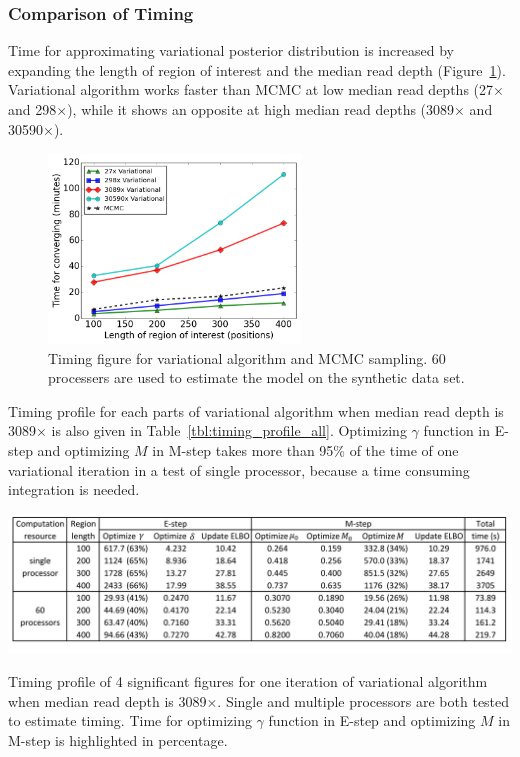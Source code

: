 \documentclass[11pt,reqno]{amsart}
\begin{document}
\subsubsection{Comparison of Timing}
Time for approximating variational posterior distribution is increased by expanding the length of region of interest and the median read depth (Figure~\ref{tbl:timing_mcmc_var}).
Variational algorithm works faster than MCMC at low median read depths (27$\times$ and 298$\times$), while it shows an opposite at high median read depths (3089$\times$ and 30590$\times$).

\begin{figure}[h]
\centering
\includegraphics[width=0.6\textwidth]{figs/timing_var_mcmc.png}
\caption{Timing figure for variational algorithm and MCMC sampling.
60 processers are used to estimate the model on the synthetic data set.}
\label{tbl:timing_mcmc_var}
\end{figure}

Timing profile for each parts of variational algorithm when median read depth is 3089$\times$ is also given in Table~\ref{tbl:timing_profile_all}.
Optimizing $\gamma$ function in E-step and optimizing $M$ in M-step takes more than 95\% of the time of one variational iteration in a test of single processor, because a time consuming integration is needed.
\begin{table}[htbp]
\centering
\vspace{10pt}
\includegraphics[width=1.0\textwidth]{tables/time_3089X_all_update.png}
\caption{Timing profile of 4 significant figures for one iteration of variational algorithm when median read depth is 3089$\times$.
Single and multiple processors are both tested to estimate timing. Time for optimizing $\gamma$ function in E-step and optimizing $M$ in M-step is highlighted in percentage.}
\label{tbl:timing_profile_all}
\end{table}
\end{document}
